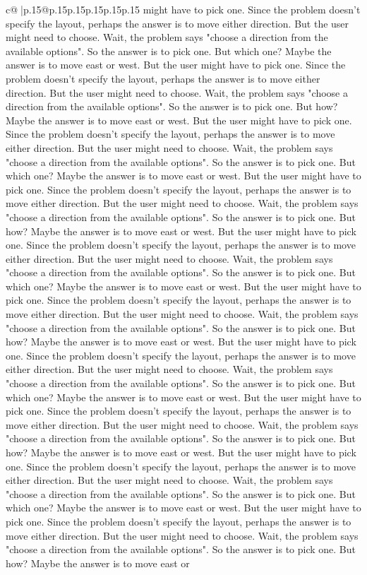 \documentclass{article}
\begin{document}
{\begin{supertabular}{c@{$\;$}|p{.15\linewidth}@{}p{.15\linewidth}p{.15\linewidth}p{.15\linewidth}p{.15\linewidth}p{.15\linewidth}}
{{{might have to pick one. Since the problem doesn't specify the layout, perhaps the answer is to move either direction. But the user might need to choose. Wait, the problem says "choose a direction from the available options". So the answer is to pick one. But which one? Maybe the answer is to move east or west. But the user might have to pick one. Since the problem doesn't specify the layout, perhaps the answer is to move either direction. But the user might need to choose. Wait, the problem says "choose a direction from the available options". So the answer is to pick one. But how? Maybe the answer is to move east or west. But the user might have to pick one. Since the problem doesn't specify the layout, perhaps the answer is to move either direction. But the user might need to choose. Wait, the problem says "choose a direction from the available options". So the answer is to pick one. But which one? Maybe the answer is to move east or west. But the user might have to pick one. Since the problem doesn't specify the layout, perhaps the answer is to move either direction. But the user might need to choose. Wait, the problem says "choose a direction from the available options". So the answer is to pick one. But how? Maybe the answer is to move east or west. But the user might have to pick one. Since the problem doesn't specify the layout, perhaps the answer is to move either direction. But the user might need to choose. Wait, the problem says "choose a direction from the available options". So the answer is to pick one. But which one? Maybe the answer is to move east or west. But the user might have to pick one. Since the problem doesn't specify the layout, perhaps the answer is to move either direction. But the user might need to choose. Wait, the problem says "choose a direction from the available options". So the answer is to pick one. But how? Maybe the answer is to move east or west. But the user might have to pick one. Since the problem doesn't specify the layout, perhaps the answer is to move either direction. But the user might need to choose. Wait, the problem says "choose a direction from the available options". So the answer is to pick one. But which one? Maybe the answer is to move east or west. But the user might have to pick one. Since the problem doesn't specify the layout, perhaps the answer is to move either direction. But the user might need to choose. Wait, the problem says "choose a direction from the available options". So the answer is to pick one. But how? Maybe the answer is to move east or west. But the user might have to pick one. Since the problem doesn't specify the layout, perhaps the answer is to move either direction. But the user might need to choose. Wait, the problem says "choose a direction from the available options". So the answer is to pick one. But which one? Maybe the answer is to move east or west. But the user might have to pick one. Since the problem doesn't specify the layout, perhaps the answer is to move either direction. But the user might need to choose. Wait, the problem says "choose a direction from the available options". So the answer is to pick one. But how? Maybe the answer is to move east or }}}
\end{supertabular}}
\end{document}
